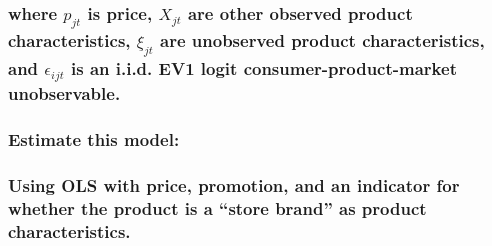 \documentclass[11pt]{article}
\begin{document}
\subsubsection*{\texorpdfstring{where \(p_{jt}\) is price, \(X_{jt}\)
are other observed product characteristics, \(ξ_{jt}\) are unobserved
product characteristics, and \(ϵ_{ijt}\) is an i.i.d. EV1 logit
consumer-product-market
unobservable.}{where p\_\{jt\} is price, X\_\{jt\} are other observed product characteristics, ξ\_\{jt\} are unobserved product characteristics, and ϵ\_\{ijt\} is an i.i.d. EV1 logit consumer-product-market unobservable.}}\label{where-p_jt-is-price-x_jt-are-other-observed-product-characteristics-ux3be_jt-are-unobserved-product-characteristics-and-ux3f5_ijt-is-an-i.i.d.-ev1-logit-consumer-product-market-unobservable.}

\subsubsection*{Estimate this model:}\label{estimate-this-model}

    \subsubsection{Using OLS with price, promotion, and an indicator for
whether the product is a ``store brand'' as product
characteristics.}\label{using-ols-with-price-promotion-and-an-indicator-for-whether-the-product-is-a-store-brand-as-product-characteristics.}
\end{document}
